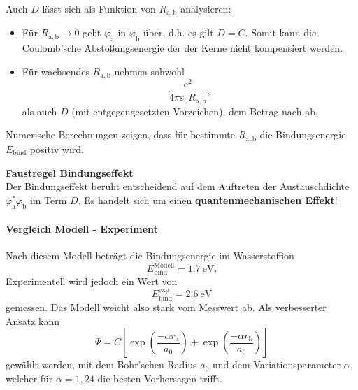     Auch $D$ lässt sich als Funktion von $R_\mathrm{a,b}$ analysieren:
    \begin{itemize}
        \item Für $R_\mathrm{a,b}\to 0 $ geht $ \varphi_\mathrm{a}$ in $ \varphi_\mathrm{b}$ über, d.h. es gilt $ D= C$. Somit kann die Coulomb'sche Abstoßungsenergie der der Kerne nicht kompensiert werden.
        \item Für wachsendes $R_\mathrm{a,b}$ nehmen sohwohl
            $$
            \frac{\mathrm{e}^2}{4 \pi \varepsilon_0 R_\mathrm{a,b}}, 
            $$ 
            als auch $D$ (mit entgegengesetzten Vorzeichen), dem Betrag nach ab.
    \end{itemize}
    Numerische Berechnungen zeigen, dass für bestimmte $R_\mathrm{a,b}$ die Bindungsenergie $E_{\text{bind}}$ positiv wird.

    \begin{important}\unboldmath
        \textbf{Faustregel Bindungseffekt}\\[1ex]
        Der Bindungseffekt beruht entscheidend auf dem Auftreten der Austauschdichte $\varphi_\mathrm{a}^{*} \varphi_\mathrm{b}$ im Term $D$. 
        Es handelt sich um einen \textbf{quantenmechanischen Effekt}!
    \end{important}

\paragraph{Vergleich Modell - Experiment}
    Nach diesem Modell beträgt die Bindungsenergie im Wasserstoffion  
    $$E^\mathrm{Modell}_\mathrm{bind}=\SI{1.7}{\electronvolt}.$$
    Experimentell wird jedoch ein Wert von 
    $$E^\mathrm{exp}_\mathrm{bind}=\SI{2.6}{\electronvolt}$$
    gemessen. Das Modell weicht also stark vom Messwert ab. Als verbesserter Ansatz kann
    $$\Psi = C\left[\exp\left(\frac{-\alpha r_\mathrm a}{a_0}\right) + \exp\left(\frac{-\alpha r_\mathrm b}{a_0}\right) \right]
    $$
    gewählt werden, mit dem Bohr'schen Radius $a_0$ und dem Variationsparameter $\alpha$, welcher für $\alpha=1,24$ die besten Vorhersagen trifft.
    
